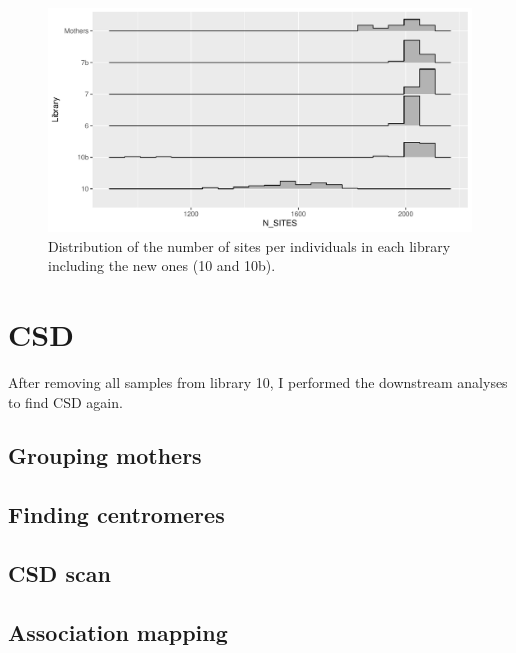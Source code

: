 \documentclass[10pt,a4paper]{report}
\begin{document}
\begin{figure}[h]
	\begin{center}
		\includegraphics[width=\textwidth]{add_samples/library_sites.pdf}
		\caption{Distribution of the number of sites per individuals in each library including the new ones (10 and 10b).}
		\label{n_sites_add}
	\end{center}
\end{figure}
\FloatBarrier

\section{CSD}

After removing all samples from library 10, I performed the downstream analyses to find CSD again.
\subsection{Grouping mothers}
\subsection{Finding centromeres}
\subsection{CSD scan}
\subsection{Association mapping}

\FloatBarrier
\end{document}
